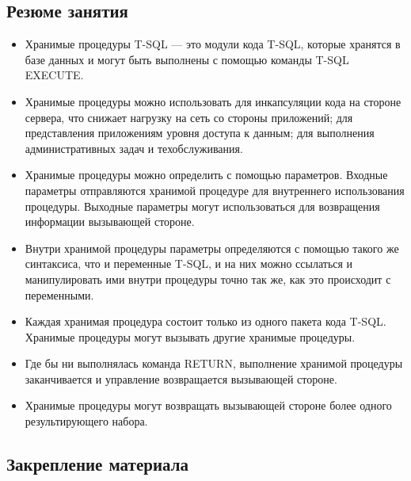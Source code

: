 \subsection*{Резюме занятия}
\begin{itemize}
	\item Хранимые процедуры T-SQL — это модули кода T-SQL, которые хранятся в базе данных и могут быть выполнены с помощью команды T-SQL EXECUTE. 
	\item Хранимые процедуры можно использовать для инкапсуляции кода на стороне
	сервера, что снижает нагрузку на сеть со стороны приложений; для представления приложениям уровня доступа к данным; для выполнения административных
	задач и техобслуживания. 
	\item Хранимые процедуры можно определить с помощью параметров. Входные параметры отправляются хранимой процедуре для внутреннего использования процедуры. Выходные параметры могут использоваться для возвращения информации вызывающей стороне. 
	\item Внутри хранимой процедуры параметры определяются с помощью такого же
	синтаксиса, что и переменные T-SQL, и на них можно ссылаться и манипулировать ими внутри процедуры точно так же, как это происходит с переменными. 
	\item Каждая хранимая процедура состоит только из одного пакета кода T-SQL. Хранимые процедуры могут вызывать другие хранимые процедуры. 
	\item Где бы ни выполнялась команда RETURN, выполнение хранимой процедуры
	заканчивается и управление возвращается вызывающей стороне. 
	\item Хранимые процедуры могут возвращать вызывающей стороне более одного
	результирующего набора. 
\end{itemize}

\subsection*{Закрепление материала}

